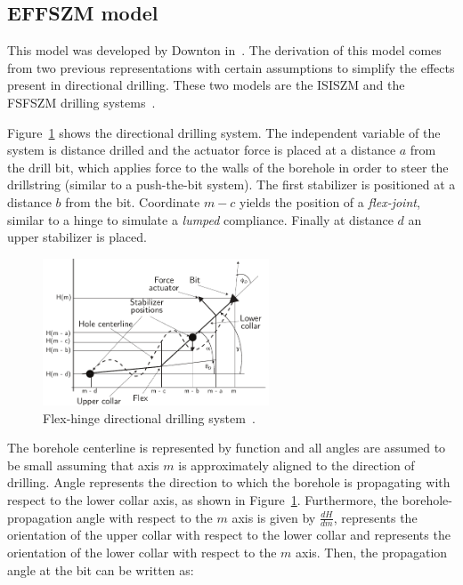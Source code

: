 \subsection{\acf{EFFSZM} model}\label{subsection:Downton}

This model was developed by Downton in~\cite{Down07}. The derivation of this model comes from two previous representations with certain assumptions to simplify the effects present in directional drilling. These two models are the \acf{ISISZM} and the \acf{FSFSZM} drilling systems~\cite{Down07}. 

Figure~\ref{fig:downton} shows the directional drilling system. The independent variable of the system is distance drilled and the actuator force is placed at a distance $a$ from the drill bit, which applies force to the walls of the borehole in order to steer the drillstring (similar to a push-the-bit system). The first stabilizer is positioned at a distance $b$ from the bit. Coordinate $m-c$ yields the position of a \textit{flex-joint}, similar to a hinge to simulate a \textit{lumped} compliance. Finally at distance $d$ an upper stabilizer is placed.

\begin{figure}[ht]\centering
	\includegraphics[width=0.6\textwidth]{img/Downtonmodel.pdf}
	\caption{\label{fig:downton}Flex-hinge directional drilling system~\cite{Down07}.}
\end{figure}

The borehole centerline is represented by function  and all angles are assumed to be small assuming that axis $m$ is approximately aligned to the direction of drilling. Angle  represents the direction to which the borehole is propagating with respect to the lower collar axis, as shown in Figure~\ref{fig:downton}. Furthermore, the borehole-propagation angle with respect to the $m$ axis is given by $\frac{dH}{dm}$,   represents the orientation of the upper collar with respect to the lower collar and  represents the orientation of the lower collar with respect to the $m$ axis. Then, the propagation angle at the bit can be written as:


